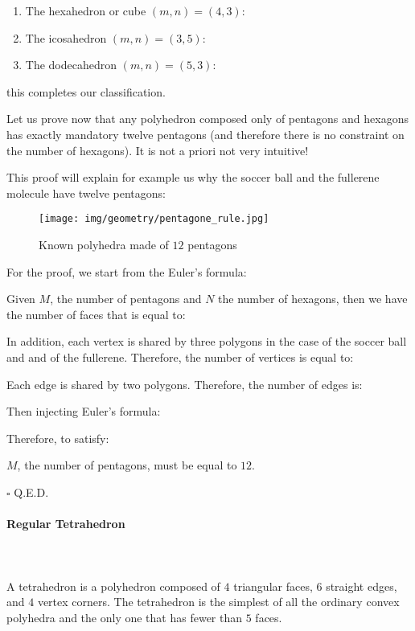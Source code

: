 {\begin{enumerate}
		
		\item The hexahedron or cube $(m,n)=(4,3)$:
		
		
		\item The icosahedron $(m,n)=(3,5)$:
		
		
		\item The dodecahedron $(m,n)=(5,3)$:
		
	\end{enumerate}
	this completes our classification.
	
	Let us prove now that any polyhedron composed only of pentagons and hexagons has exactly mandatory  twelve pentagons (and therefore there is no constraint on the number of hexagons). It is not a priori not very intuitive!
	
	This proof will explain for example us why the soccer ball and the fullerene molecule have twelve pentagons:
	\begin{figure}[H]
		\centering
		\texttt{[image: img/geometry/pentagone\_rule.jpg]}
		\caption{Known polyhedra made of $12$ pentagons}
	\end{figure}
	\begin{dem}
	For the proof, we start from the Euler's formula:
	
	Given $M$, the number of pentagons and $N$ the number of hexagons, then we have the number of faces that is equal to:
	
	In addition, each vertex is shared by three polygons in the case of the soccer ball and and of the fullerene. Therefore, the number of vertices is equal to:
	
	Each edge is shared by two polygons. Therefore, the number of edges is:
	
	Then injecting Euler's formula:
	
	Therefore, to satisfy:
	
	$M$, the number of pentagons, must be equal to $12$.
	\begin{flushright}
		$\square$  Q.E.D.
	\end{flushright}
	\end{dem}
	
	\paragraph{Regular Tetrahedron}\mbox{}\\\\
	A tetrahedron is a polyhedron composed of $4$ triangular faces, $6$ straight edges, and $4$ vertex corners. The tetrahedron is the simplest of all the ordinary convex polyhedra and the only one that has fewer than $5$ faces.
	
}
